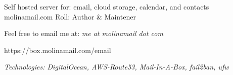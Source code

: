 \begin{cventries}
    \cventry
      {Self hosted server for: email, cloud storage, calendar, and contacts} %
      {molinamail.com} %
      {} %
      {Roll: Author \& Maintener} %
      {
        \begin{cvitems} %
        \item {Feel free to email me at: \it{me at molinamail dot com}}
        \item {https://box.molinamail.com/email}
        \item {\it{Technologies:} DigitalOcean, AWS-Route53, Mail-In-A-Box, fail2ban, ufw }
        \end{cvitems}
      }

\end{cventries}
